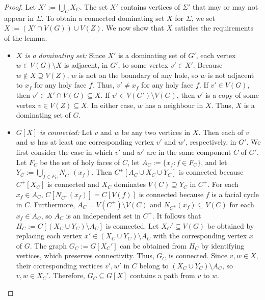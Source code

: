 \documentclass{patmorin}
\begin{document}
\begin{proof}
Let $X':=\bigcup_{C} X_C$.  The set $X'$ contains vertices of $\Sigma'$ that may or may not appear in $\Sigma$. To obtain a connected dominating set $X$ for $\Sigma$, we set $X:=(X'\cap V(G))\cup V(Z)$. We now show that $X$ satisfies the requirements of the lemma.
\begin{itemize}
    \item \emph{$X$ is a dominating set:} Since $X'$ is a dominating set of $G'$, each vertex $w\in V(G)\setminus X$ is adjacent, in $G'$, to some vertex $v'\in X'$. Because $w \notin X \supseteq V(Z)$, $w$ is not on the boundary of any hole, so $w$ is not adjacent to $x_f$ for any holy face $f$. Thus, $v' \ne x_f$ for any holy face $f$. If $v'\in V(G)$, then $v'\in X' \cap V(G) \subseteq X$. If $v'\in V(G')\setminus V(G)$, then $v'$ is a copy of some vertex $v \in V(Z) \subseteq X$. In either case, $w$ has a neighbour in $X$. Thus, $X$ is a dominating set of $G$.

    \item \emph{$G[X]$ is connected:} Let $v$ and $w$ be any two vertices in $X$. Then each of $v$ and $w$ has at least one corresponding vertex $v'$ and $w'$, respectively, in $G'$. We first consider the case in which $v'$ and $w'$ are in the same component $C$ of $G'$. Let $F_C$ be the set of holy faces of $C$, let $A_C:=\{x_f:f\in F_C\}$, and let $Y_C:=\bigcup_{f\in F_C} N_{C^+}(x_f)$. Then $C^+[A_C\cup X_C\cup Y_C]$ is connected because $C^+[X_C]$ is connected and $X_C$ dominates $V(C)\supseteq Y_C$ in $C^+$. For each $x_f\in A_C$, $C[N_{C^+}(x_f)]=C[V(f)]$ is connected because $f$ is a facial cycle in $C$.  Furthermore, $A_C=V(C^+)\setminus V(C)$ and $N_{C^+}(x_f)\subseteq V(C)$ for each $x_f \in A_C$, so $A_C$ is an independent set in $C^+$. It follows that $H_C:=C[(X_C\cup Y_C)\setminus A_C]$ is connected.  Let $X_C'\subseteq V(G)$ be obtained by replacing each vertex $x'\in (X_C\cup Y_C)\setminus A_C$ with the corresponding vertex $x$ of $G$.  The graph $G_C:=G[X_C']$ can be obtained from $H_C$ by identifying vertices, which preserves connectivity.  Thus, $G_C$ is connected.
    Since $v, w \in X$, their corresponding vertices $v', w'$ in $C$ belong to $(X_C\cup Y_C)\setminus A_C$, so $v, w \in X_C'$. Therefore, $G_C \subseteq G[X]$ contains a path from $v$ to $w$.
    

\end{itemize}
\end{proof}
\end{document}
